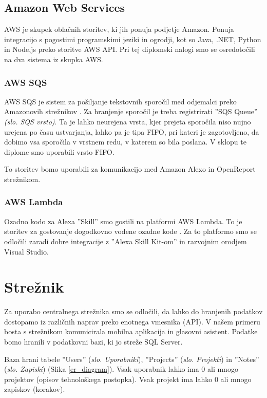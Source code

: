 \documentclass[a4paper, 12pt]{book}
\begin{document}
\subsection{Amazon Web Services}

AWS je skupek oblačnih storitev, ki jih ponuja podjetje Amazon.
Ponuja integracijo s pogostimi programskimi jeziki in ogrodji, kot so Java, .NET, Python in Node.js preko storitve AWS API.
Pri tej diplomski nalogi smo se osredotočili na dva sistema iz skupka AWS.

\subsubsection{AWS SQS}

AWS SQS je sistem za pošiljanje tekstovnih sporočil med odjemalci preko Amazonovih strežnikov \cite{sqs}.
Za hranjenje sporočil je treba registrirati ''SQS Queue'' \textit{(slo. SQS vrsto)}. 
Ta je lahko neurejena vrsta, kjer prejeta sporočila niso nujno urejena po času ustvarjanja, lahko pa je tipa FIFO, pri kateri je zagotovljeno, da dobimo vsa sporočila v vrstnem redu, v katerem so bila poslana.
V sklopu te diplome smo uporabili vrsto FIFO.

To storitev bomo uporabili za komunikacijo med Amazon Alexo in OpenReport strežnikom.

\subsubsection{AWS Lambda}

Ozadno kodo za Alexa ''Skill'' smo gostili na platformi AWS Lambda.
To je storitev za gostovanje dogodkovno vodene ozadne kode \cite{lambda}.
Za to platformo smo se odločili zaradi dobre integracije z ''Alexa Skill Kit-om'' in razvojnim orodjem Visual Studio.

\section{Strežnik}

Za uporabo centralnega strežnika smo se odločili, da lahko do hranjenih podatkov dostopamo iz različnih naprav preko enotnega vmesnika (API).
V našem primeru bosta s strežnikom komunicirala mobilna aplikacija in glasovni asistent.
Podatke bomo hranili v podatkovni bazi, ki jo streže SQL Server.

Baza hrani tabele ''Users'' (\textit{slo. Uporabniki}), ''Projects'' (\textit{slo. Projekti}) in ''Notes'' (\textit{slo. Zapiski}) (Slika \ref{er_diagram}).
Vsak uporabnik lahko ima 0 ali mnogo projektov (opisov tehnološkega postopka).
Vsak projekt ima lahko 0 ali mnogo zapiskov (korakov).
\end{document}
